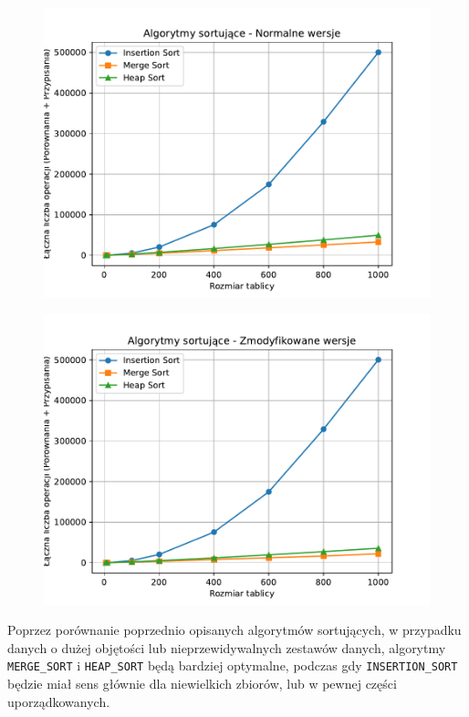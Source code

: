 \documentclass{article}
\begin{document}
\begin{enumerate}
\begin{figure}[H]
	\centering
	\includegraphics[width=1\textwidth]{Figure_4.pdf}
\end{figure}
\begin{figure}[H]
	\centering
	\includegraphics[width=1\textwidth]{Figure_5.pdf}
\end{figure}
\end{enumerate}
Poprzez porównanie poprzednio opisanych algorytmów sortujących,  w przypadku danych o dużej objętości lub nieprzewidywalnych zestawów danych, algorytmy \texttt{MERGE\_SORT} i \texttt{HEAP\_SORT} będą bardziej optymalne, podczas gdy \texttt{INSERTION\_SORT} będzie miał sens głównie dla niewielkich zbiorów, lub w pewnej części uporządkowanych.
\end{document}
